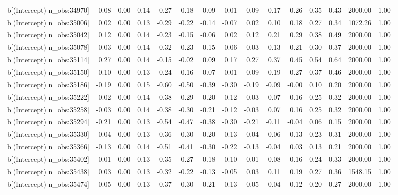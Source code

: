 \begin{table}[ht]
\begin{tabular}{rrrrrrrrrrrrrrr}
  b[(Intercept) n\_obs:34970] & 0.08 & 0.00 & 0.14 & -0.27 & -0.18 & -0.09 & -0.01 & 0.09 & 0.17 & 0.26 & 0.35 & 0.43 & 2000.00 & 1.00 \\ 
  b[(Intercept) n\_obs:35006] & 0.02 & 0.00 & 0.13 & -0.29 & -0.22 & -0.14 & -0.07 & 0.02 & 0.10 & 0.18 & 0.27 & 0.34 & 1072.26 & 1.00 \\ 
  b[(Intercept) n\_obs:35042] & 0.12 & 0.00 & 0.14 & -0.23 & -0.15 & -0.06 & 0.02 & 0.12 & 0.21 & 0.29 & 0.38 & 0.49 & 2000.00 & 1.00 \\ 
  b[(Intercept) n\_obs:35078] & 0.03 & 0.00 & 0.14 & -0.32 & -0.23 & -0.15 & -0.06 & 0.03 & 0.13 & 0.21 & 0.30 & 0.37 & 2000.00 & 1.00 \\ 
  b[(Intercept) n\_obs:35114] & 0.27 & 0.00 & 0.14 & -0.15 & -0.02 & 0.09 & 0.17 & 0.27 & 0.37 & 0.45 & 0.54 & 0.64 & 2000.00 & 1.00 \\ 
  b[(Intercept) n\_obs:35150] & 0.10 & 0.00 & 0.13 & -0.24 & -0.16 & -0.07 & 0.01 & 0.09 & 0.19 & 0.27 & 0.37 & 0.46 & 2000.00 & 1.00 \\ 
  b[(Intercept) n\_obs:35186] & -0.19 & 0.00 & 0.15 & -0.60 & -0.50 & -0.39 & -0.30 & -0.19 & -0.09 & -0.00 & 0.10 & 0.20 & 2000.00 & 1.00 \\ 
  b[(Intercept) n\_obs:35222] & -0.02 & 0.00 & 0.14 & -0.38 & -0.29 & -0.20 & -0.12 & -0.03 & 0.07 & 0.16 & 0.25 & 0.32 & 2000.00 & 1.00 \\ 
  b[(Intercept) n\_obs:35258] & -0.03 & 0.00 & 0.14 & -0.38 & -0.30 & -0.21 & -0.12 & -0.03 & 0.07 & 0.16 & 0.25 & 0.32 & 2000.00 & 1.00 \\ 
  b[(Intercept) n\_obs:35294] & -0.21 & 0.00 & 0.13 & -0.54 & -0.47 & -0.38 & -0.30 & -0.21 & -0.11 & -0.04 & 0.06 & 0.15 & 2000.00 & 1.00 \\ 
  b[(Intercept) n\_obs:35330] & -0.04 & 0.00 & 0.13 & -0.36 & -0.30 & -0.20 & -0.13 & -0.04 & 0.06 & 0.13 & 0.23 & 0.31 & 2000.00 & 1.00 \\ 
  b[(Intercept) n\_obs:35366] & -0.13 & 0.00 & 0.14 & -0.51 & -0.41 & -0.30 & -0.22 & -0.13 & -0.04 & 0.03 & 0.13 & 0.21 & 2000.00 & 1.00 \\ 
  b[(Intercept) n\_obs:35402] & -0.01 & 0.00 & 0.13 & -0.35 & -0.27 & -0.18 & -0.10 & -0.01 & 0.08 & 0.16 & 0.24 & 0.33 & 2000.00 & 1.00 \\ 
  b[(Intercept) n\_obs:35438] & 0.03 & 0.00 & 0.13 & -0.32 & -0.22 & -0.13 & -0.05 & 0.03 & 0.11 & 0.19 & 0.27 & 0.36 & 1548.15 & 1.00 \\ 
  b[(Intercept) n\_obs:35474] & -0.05 & 0.00 & 0.13 & -0.37 & -0.30 & -0.21 & -0.13 & -0.05 & 0.04 & 0.12 & 0.20 & 0.27 & 2000.00 & 1.00 \\ 

\end{tabular}
\end{table}
